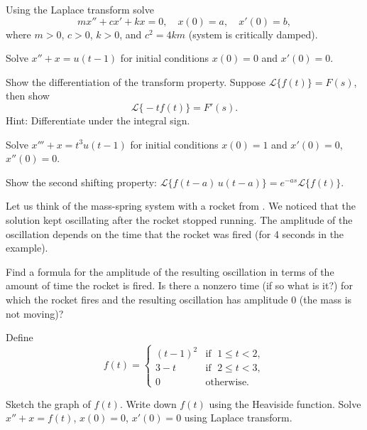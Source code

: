 \begin{exercise}
Using the Laplace transform solve
\begin{equation*}
m x'' + c x' + k x = 0 , \quad x(0) = a, \quad x'(0) = b ,
\end{equation*}
where $m > 0$, $c > 0$, $k > 0$, and
$c^2 = 4km$ (system is critically damped).
\end{exercise}

\begin{exercise}
Solve $x'' + x = u(t-1)$ for initial conditions $x(0) = 0$ and $x'(0) = 0$.
\end{exercise}

\begin{exercise}
Show the differentiation of the transform property.  Suppose
$\mathcal{L} \bigl\{ f(t) \bigr\} = F(s)$, then show
\begin{equation*}
\mathcal{L} \bigl\{ -t f(t) \bigr\} = F'(s) .
\end{equation*}
Hint: Differentiate under the integral sign.
\end{exercise}

\begin{exercise}
Solve $x''' + x = t^3 u(t-1)$ for initial conditions $x(0) = 1$ and $x'(0) =
0$, $x''(0) = 0$.
\end{exercise}

\begin{exercise}
Show the second shifting property: 
$\mathcal{L} \bigl\{ f(t-a) \, u(t-a) \bigr\}
= e^{-as} \mathcal{L} \bigl\{ f(t) \bigr\}$.
\end{exercise}

\begin{exercise}
Let us think of the mass-spring system with a rocket from
.  We noticed that the solution kept oscillating
after the rocket stopped running.  The amplitude of the oscillation depends
on the time that the rocket was fired (for 4 seconds in the example).
\begin{tasks}
\task
Find a formula for the amplitude of the resulting oscillation
in terms of the amount of time the rocket is fired.
\task
 Is there
a nonzero time (if so what is it?)
for which the rocket fires and the resulting oscillation
has amplitude 0 (the mass is not moving)?
\end{tasks}
\end{exercise}

\begin{exercise}
Define
\begin{equation*}
f(t) =
\begin{cases}
{(t-1)}^2 & \text{if } \; 1 \leq t < 2, \\
3-t & \text{if } \; 2 \leq t < 3, \\
0 & \text{otherwise} .
\end{cases}
\end{equation*}
\begin{tasks}
\task Sketch the graph of $f(t)$.
\task Write down $f(t)$ using the Heaviside function.
\task Solve $x''+x=f(t)$, $x(0)=0$, $x'(0) = 0$ using Laplace transform.
\end{tasks}
\end{exercise}

